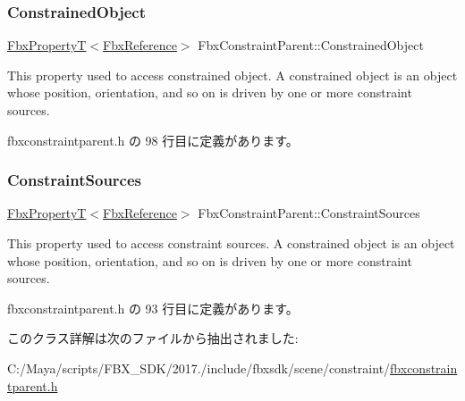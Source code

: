 \subsubsection{\texorpdfstring{Constrained\+Object}{ConstrainedObject}}
{\footnotesize\ttfamily \hyperlink{class_fbx_property_t}{Fbx\+PropertyT}$<$\hyperlink{fbxtypes_8h_a44df6a2eec915cf27cd481e5c5e48a24}{Fbx\+Reference}$>$ Fbx\+Constraint\+Parent\+::\+Constrained\+Object}

This property used to access constrained object. A constrained object is an object whose position, orientation, and so on is driven by one or more constraint sources. 

 fbxconstraintparent.\+h の 98 行目に定義があります。

\mbox{\label{class_fbx_constraint_parent_a02690debabacd0fe4b643cbb04c042a7}} 
\subsubsection{\texorpdfstring{Constraint\+Sources}{ConstraintSources}}
{\footnotesize\ttfamily \hyperlink{class_fbx_property_t}{Fbx\+PropertyT}$<$\hyperlink{fbxtypes_8h_a44df6a2eec915cf27cd481e5c5e48a24}{Fbx\+Reference}$>$ Fbx\+Constraint\+Parent\+::\+Constraint\+Sources}

This property used to access constraint sources. A constrained object is an object whose position, orientation, and so on is driven by one or more constraint sources. 

 fbxconstraintparent.\+h の 93 行目に定義があります。



このクラス詳解は次のファイルから抽出されました\+:\begin{DoxyCompactItemize}
\item 
C\+:/\+Maya/scripts/\+F\+B\+X\+\_\+\+S\+D\+K/2017./include/fbxsdk/scene/constraint/\hyperlink{fbxconstraintparent_8h}{fbxconstraintparent.\+h}\end{DoxyCompactItemize}
